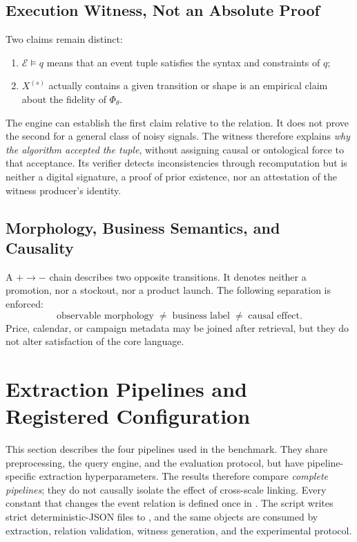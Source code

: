 \documentclass[11pt,a4paper]{article}
\newcommand{\Events}{\mathcal{E}}
\begin{document}
\subsection{Execution Witness, Not an Absolute Proof}

Two claims remain distinct:
\begin{enumerate}
  \item $\Events\models q$ means that an event tuple satisfies the syntax and constraints of $q$;
  \item $X^{(s)}$ actually contains a given transition or shape is an empirical claim about the fidelity of $\Phi_{\theta}$.
\end{enumerate}
The engine can establish the first claim relative to the relation. It does not prove the second for a general class of noisy signals. The witness therefore explains \emph{why the algorithm accepted the tuple}, without assigning causal or ontological force to that acceptance. Its verifier detects inconsistencies through recomputation but is neither a digital signature, a proof of prior existence, nor an attestation of the witness producer's identity.

\subsection{Morphology, Business Semantics, and Causality}

A $+\rightarrow-$ chain describes two opposite transitions. It denotes neither a promotion, nor a stockout, nor a product launch. The following separation is enforced:
\begin{equation}
\text{observable morphology}\;\neq\;\text{business label}\;\neq\;\text{causal effect}.
\end{equation}
Price, calendar, or campaign metadata may be joined after retrieval, but they do not alter satisfaction of the core language.

\section{Extraction Pipelines and Registered Configuration}

This section describes the four pipelines used in the benchmark. They share preprocessing, the query engine, and the evaluation protocol, but have pipeline-specific extraction hyperparameters. The results therefore compare \emph{complete pipelines}; they do not causally isolate the effect of cross-scale linking. Every constant that changes the event relation is defined once in . The script writes strict deterministic-JSON files to , and the same objects are consumed by extraction, relation validation, witness generation, and the experimental protocol.
\end{document}
